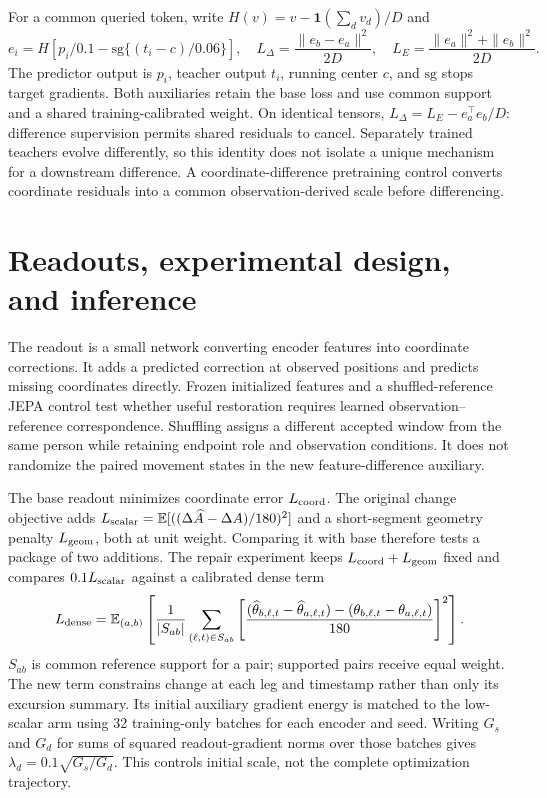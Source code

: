 \documentclass{article}
\begin{document}
For a common queried token, write $H(v)=v-\mathbf1(\sum_d v_d)/D$ and
\begin{equation}
e_i=H\left[p_i/0.1-\mathrm{sg}\{(t_i-c)/0.06\}\right],\quad
L_\Delta=\frac{\|e_b-e_a\|^2}{2D},\quad
L_E=\frac{\|e_a\|^2+\|e_b\|^2}{2D}.
\label{eq:feature}
\end{equation}
The predictor output is $p_i$, teacher output $t_i$, running center $c$, and $\mathrm{sg}$ stops target gradients. Both auxiliaries retain the base loss and use common support and a shared training-calibrated weight. On identical tensors, $L_\Delta=L_E-e_a^\top e_b/D$: difference supervision permits shared residuals to cancel. Separately trained teachers evolve differently, so this identity does not isolate a unique mechanism for a downstream difference. A coordinate-difference pretraining control converts coordinate residuals into a common observation-derived scale before differencing.

\clearpage
\section{Readouts, experimental design, and inference}
The readout is a small network converting encoder features into coordinate corrections. It adds a predicted correction at observed positions and predicts missing coordinates directly. Frozen initialized features and a shuffled-reference JEPA control test whether useful restoration requires learned observation--reference correspondence. Shuffling assigns a different accepted window from the same person while retaining endpoint role and observation conditions. It does not randomize the paired movement states in the new feature-difference auxiliary.

The base readout minimizes coordinate error $L_{\rm coord}$. The original change objective adds $L_{\rm scalar}=\mathbb E[((\Delta\widehat A-\Delta A)/180)^2]$ and a short-segment geometry penalty $L_{\rm geom}$, both at unit weight. Comparing it with base therefore tests a package of two additions. The repair experiment keeps $L_{\rm coord}+L_{\rm geom}$ fixed and compares $0.1L_{\rm scalar}$ against a calibrated dense term
\begin{equation}
L_{\rm dense}=\mathbb E_{(a,b)}\left[\frac{1}{|S_{ab}|}\sum_{(\ell,t)\in S_{ab}}
\left[\frac{(\widehat\theta_{b,\ell,t}-\widehat\theta_{a,\ell,t})-(\theta_{b,\ell,t}-\theta_{a,\ell,t})}{180}\right]^2\right].
\end{equation}
$S_{ab}$ is common reference support for a pair; supported pairs receive equal weight. The new term constrains change at each leg and timestamp rather than only its excursion summary. Its initial auxiliary gradient energy is matched to the low-scalar arm using 32 training-only batches for each encoder and seed. Writing $G_s$ and $G_d$ for sums of squared readout-gradient norms over those batches gives $\lambda_d=0.1\sqrt{G_s/G_d}$. This controls initial scale, not the complete optimization trajectory.
\end{document}
